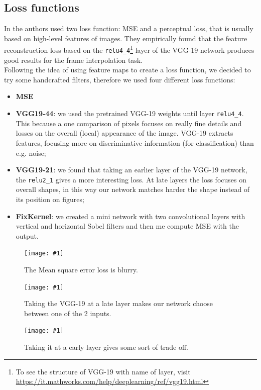 \documentclass[11pt, a4paper]{article}
\newcommand{\image}[3]{
	\begin{figure}%
		\centering
		\texttt{[image: \#1]}
		\caption{#2.}
		\label{#3}
	\end{figure}
}
\begin{document}
	\subsection{Loss functions}
	In \cite{mainpaper} the authors used two loss function: MSE and a perceptual loss, that is usually based on high-level features of	images. They empirically found that the feature reconstruction loss based on the \texttt{relu4\_4}\footnote{\label{vgg-structure}To see the structure of VGG-19 with name of layer, visit \url{https://it.mathworks.com/help/deeplearning/ref/vgg19.html}} layer of the VGG-19 network produces good results for the frame interpolation task.\\
	Following the idea of using feature maps to create a loss function, we decided to try some handcrafted filters, therefore we used four different loss functions:
	\begin{itemize}
		\item \textbf{MSE}
		\item \textbf{VGG19-44}: we used the pretrained VGG-19 weights until layer \texttt{relu4\_4}. This because a one comparison of pixels focuses on really fine details and losses on the overall (local) appearance of the image. VGG-19 extracts features, focusing more on discriminative information (for classification) than e.g. noise;
		\item \textbf{VGG19-21}: we found that taking an earlier layer of the VGG-19 network, the \texttt{relu2\_1} gives a more interesting loss. At late layers the loss focuses on overall shapes, in this way our network matches harder the shape instead of its position on figures;
		\item \textbf{FixKernel}: we created a mini network with two convolutional layers with vertical and horizontal Sobel filters and then me compute MSE with the output.
	\end{itemize}
	 
	\image{mse_loss2}{The Mean square error loss is blurry}{loss-mse}
	\image{vgg16_relu4_4_loss2}{Taking the VGG-19 at a late layer makes our network choose between one of the 2 inputs}{loss-vgg19-44}
	\image{vgg16_relu2_1_loss2}{Taking it at a early layer gives some sort of trade off}{loss-vgg19-21}
\end{document}
